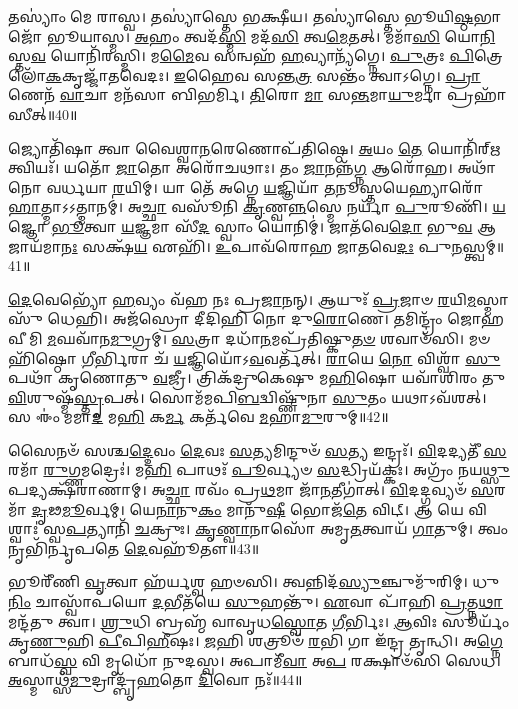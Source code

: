 𑌤𑌸𑍍𑌯𑌾𑌂॑ 𑌮𑍇 𑌰𑌾𑌸𑍍𑌵।
𑌤𑌸𑍍𑌯𑌾॑𑌸𑍍𑌤𑍇 𑌭𑌕𑍍𑌷𑍀𑌯।
𑌤𑌸𑍍𑌯𑌾॑𑌸𑍍𑌤𑍇 𑌭𑍂𑌯𑌿\-\ul{𑌷𑍍𑌠}\-𑌭𑌾𑌜𑍋᳴ 𑌭𑍂𑌯𑌾𑌸𑍍𑌮।
\-\ul{𑌅}\-𑌹𑌂 𑌤𑍍𑌵𑌦᳴\-\ul{𑌸𑍍𑌮𑌿} 𑌮𑌦᳴\-\ul{𑌸𑌿} 𑌤𑍍𑌵\-\ul{𑌮𑍇}\-𑌤𑌤𑍍।
𑌮𑌮𑌾᳴\-\ul{𑌸𑌿} 𑌯𑍋\-\ul{𑌨𑌿}\-𑌸𑍍𑌤\-\ul{𑌵} 𑌯𑍋𑌨𑌿᳴𑌰𑌸𑍍𑌮𑌿।
𑌮\-\ul{𑌮𑍈}\-𑌵 𑌸𑌨𑍍𑌵𑌹᳴ \ul{𑌹}\-𑌵𑍍𑌯𑌾𑌨𑍍𑌯᳴𑌗𑍍𑌨𑍇।
\-\ul{𑌪𑍁}\-𑌤𑍍𑌰𑌃 \ul{𑌪𑌿}\-𑌤𑍍𑌰𑍇 𑌲𑍋᳴\-\ul{𑌕}\-𑌕𑍃𑌜𑍍𑌜𑌾᳴𑌤𑌵𑍇𑌦𑌃।
\-\ul{𑌇}\-𑌹𑍈𑌵 𑌸𑌨𑍍𑌤\-\ul{𑌤𑍍𑌰} 𑌸𑌨𑍍𑌤𑌂᳴ 𑌤𑍍𑌵𑌾\-𑌽𑌗𑍍𑌨𑍇।
\-\ul{𑌪𑍍𑌰𑌾}\-𑌣𑍇𑌨᳴ \ul{𑌵𑌾}\-𑌚𑌾 𑌮𑌨᳴𑌸𑌾 𑌬𑌿𑌭𑌰𑍍𑌮𑌿।
\-\ul{𑌤𑌿}\-𑌰𑍋 \ul{𑌮𑌾} 𑌸\-\ul{𑌨𑍍𑌤}\-𑌮𑌾\-\ul{𑌯𑍁}\-𑌰𑍍𑌮𑌾 𑌪𑍍𑌰𑌹𑌾᳴𑌸𑍀𑌤𑍍॥40॥

𑌜𑍍𑌯𑍋𑌤𑌿᳴𑌷𑌾 𑌤𑍍𑌵𑌾 𑌵𑍈𑌶𑍍𑌵𑌾\-\ul{𑌨}\-𑌰𑍇𑌣𑍋𑌪᳴𑌤𑌿𑌷𑍍𑌠𑍇।
\-\ul{𑌅}\-𑌯𑌂 \ul{𑌤𑍇} 𑌯𑍋𑌨𑌿᳴𑌰𑍍\mbox{}\-\ul{𑌋}\-𑌤𑍍𑌵𑌿𑌯𑌃᳴।
𑌯𑌤𑍋᳴ \ul{𑌜𑌾}\-𑌤𑍋 𑌅𑌰𑍋᳴𑌚𑌥𑌾𑌃।
𑌤𑌂 \ul{𑌜𑌾}\-𑌨𑌨𑍍𑌨᳴\-\ul{𑌗𑍍𑌨} 𑌆𑌰𑍋᳴𑌹।
𑌅𑌥𑌾᳴ 𑌨𑍋 𑌵𑌰𑍍𑌧𑌯𑌾 \ul{𑌰}\-𑌯𑌿𑌮𑍍।
𑌯𑌾 𑌤𑍇᳴ 𑌅𑌗𑍍𑌨𑍇 \ul{𑌯}\-𑌜𑍍𑌞𑌿𑌯𑌾᳴ \ul{𑌤}\-𑌨𑍂𑌸𑍍𑌤𑌯𑍇𑌹𑍍𑌯𑌾𑌰𑍋᳴\-\ul{𑌹𑌾}\-𑌤𑍍𑌮𑌾\-𑌽𑌽𑌤𑍍𑌮𑌾𑌨𑌮𑍍॑।
𑌅\-\ul{𑌚𑍍𑌛𑌾} 𑌵𑌸𑍂᳴𑌨𑌿 \ul{𑌕𑍃}\-𑌣𑍍𑌵\-\ul{𑌨𑍍𑌨}\-𑌸𑍍𑌮𑍇 𑌨𑌰𑍍𑌯𑌾᳴ \ul{𑌪𑍁}\-𑌰𑍂𑌣𑌿᳴।
\-\ul{𑌯}\-𑌜𑍍𑌞𑍋 \ul{𑌭𑍂}\-𑌤𑍍𑌵𑌾 \ul{𑌯}\-𑌜𑍍𑌞𑌮𑌾 𑌸𑍀᳴\-\ul{𑌦} 𑌸𑍍𑌵𑌾𑌂 𑌯𑍋𑌨𑌿𑌮𑍍॑।
𑌜𑌾𑌤᳴𑌵𑍇\-\ul{𑌦𑍋} 𑌭𑍁\-\ul{𑌵} 𑌆 𑌜𑌾𑌯᳴𑌮𑌾\-\ul{𑌨𑌃} 𑌸𑌕𑍍𑌷᳴\-\ul{𑌯} 𑌏𑌹𑌿᳴।
\-\ul{𑌉}\-𑌪𑌾𑌵᳴𑌰𑍋𑌹 𑌜𑌾𑌤𑌵𑍇\-\ul{𑌦𑌃} 𑌪𑍁\-\ul{𑌨}\-𑌸𑍍𑌤𑍍𑌵𑌮𑍍॥41॥

\-\ul{𑌦𑍇}\-𑌵𑍇𑌭𑍍𑌯𑍋᳴ \ul{𑌹}\-𑌵𑍍𑌯𑌂 𑌵᳴𑌹 𑌨𑌃 𑌪𑍍𑌰\-\ul{𑌜𑌾}\-𑌨𑌨𑍍।
𑌆𑌯𑍁𑌃᳴ \ul{𑌪𑍍𑌰}\-𑌜𑌾𑍞 \ul{𑌰}\-𑌯𑌿\-\ul{𑌮}\-𑌸𑍍𑌮𑌾𑌸𑍁᳴ 𑌧𑍇𑌹𑌿।
𑌅𑌜᳴𑌸𑍍𑌰𑍋 𑌦𑍀𑌦𑌿𑌹𑌿 𑌨𑍋 𑌦𑍁\-\ul{𑌰𑍋}\-𑌣𑍇।
𑌤𑌮𑌿𑌨𑍍𑌦𑍍𑌰𑌂᳴ 𑌜𑍋𑌹𑌵𑍀𑌮𑌿 \ul{𑌮}\-𑌘𑌵𑌾᳴𑌨\-\ul{𑌮𑍁}\-𑌗𑍍𑌰𑌮𑍍।
\-\ul{𑌸}\-𑌤𑍍𑌰𑌾 𑌦𑌧𑌾᳴\-\ul{𑌨}\-𑌮𑌪𑍍𑌰᳴𑌤𑌿𑌷𑍍𑌕𑍁\-\ul{𑌤}\-\-\ul{𑍞} 𑌶𑌵𑌾𑍞᳴𑌸𑌿।
𑌮𑍞𑌹𑌿᳴𑌷𑍍𑌠𑍋 \ul{𑌗𑍀}\-𑌰𑍍𑌭𑌿𑌰𑌾 𑌚᳴ \ul{𑌯}\-𑌜𑍍𑌞𑌿𑌯𑍋᳴\-𑌽\-\ul{𑌵}\-𑌵𑌰𑍍𑌤᳴𑌤𑍍।
\-\ul{𑌰𑌾}\-𑌯𑍇 \ul{𑌨𑍋} 𑌵𑌿𑌶𑍍𑌵𑌾᳴ \ul{𑌸𑍁}\-𑌪𑌥𑌾᳴ 𑌕𑍃𑌣𑍋𑌤𑍁 \ul{𑌵}\-𑌜𑍍𑌰𑍀।
𑌤𑍍𑌰𑌿𑌕᳴𑌦𑍍𑌰𑍁𑌕𑍇𑌷𑍁 𑌮\-\ul{𑌹𑌿}\-𑌷𑍋 𑌯𑌵𑌾᳴𑌶𑌿𑌰𑌂 𑌤𑍁\-\ul{𑌵𑌿}\-𑌶𑍁𑌷𑍍𑌮᳴\-\ul{𑌸𑍍𑌤𑍃}\-𑌪𑌤𑍍।
𑌸𑍋𑌮᳴𑌮𑌪𑌿\-\ul{𑌬}\-𑌦𑍍𑌵𑌿𑌷𑍍𑌣𑍁᳴𑌨𑌾 \ul{𑌸𑍁}\-𑌤𑌂 𑌯𑌥𑌾\-𑌽𑌵᳴𑌶𑌤𑍍।
𑌸 𑌈𑌂॑ 𑌮𑌮𑌾\-\ul{𑌦} 𑌮\-\ul{𑌹𑌿} 𑌕\-\ul{𑌰𑍍𑌮} 𑌕𑌰𑍍𑌤᳴𑌵𑍇 \ul{𑌮}\-𑌹𑌾\-\ul{𑌮𑍁}\-𑌰𑍁𑌮𑍍॥42॥

𑌸𑍈𑌨𑍞᳴ 𑌸𑌶𑍍𑌚\-\ul{𑌦𑍍𑌦𑍇}\-𑌵𑌂 \ul{𑌦𑍇}\-𑌵𑌃 \ul{𑌸}\-𑌤𑍍𑌯𑌮𑌿𑌨𑍍𑌦𑍁𑍞᳴ \ul{𑌸}\-𑌤𑍍𑌯 𑌇𑌨𑍍𑌦𑍍𑌰𑌃᳴।
\-\ul{𑌵𑌿}\-𑌦𑌦𑍍𑌯𑌤𑍀᳴ \ul{𑌸}\-𑌰𑌮𑌾᳴ \ul{𑌰𑍁}\-𑌗𑍍𑌣𑌮𑌦𑍍𑌰𑍇𑌃॑।
𑌮\-\ul{𑌹𑌿} 𑌪𑌾𑌥𑌃᳴ \ul{𑌪𑍂}\-𑌰𑍍𑌵𑍍𑌯𑍞 \ul{𑌸}\-𑌦𑍍𑌧𑍍𑌰𑌿𑌯᳴𑌕𑍍𑌕𑌃।
𑌅𑌗𑍍𑌰𑌂᳴ 𑌨𑌯\-\ul{𑌥𑍍𑌸𑍁}\-𑌪𑌦𑍍𑌯𑌕𑍍𑌷᳴𑌰𑌾𑌣𑌾𑌮𑍍।
𑌅\-\ul{𑌚𑍍𑌛𑌾} 𑌰𑌵𑌂᳴ 𑌪𑍍𑌰\-\ul{𑌥}\-𑌮𑌾 𑌜𑌾᳴\-\ul{𑌨}\-𑌤𑍀𑌗𑌾॑𑌤𑍍।
\-\ul{𑌵𑌿}\-𑌦𑌦𑍍𑌗𑌵𑍍𑌯𑍞᳴ \ul{𑌸}\-𑌰𑌮𑌾᳴ \ul{𑌦𑍃}\-𑌢\-\ul{𑌮𑍂}\-𑌰𑍍𑌵𑌮𑍍।
𑌯𑍇\-\ul{𑌨𑌾}\-𑌨𑍁\-\ul{𑌕𑌂} 𑌮𑌾𑌨𑍁᳴\-\ul{𑌷𑍀} 𑌭𑍋𑌜᳴\-\ul{𑌤𑍇} 𑌵𑌿𑌟𑍍।
𑌆 𑌯𑍇 𑌵𑌿𑌶𑍍𑌵𑌾𑌃॑ 𑌸𑍍𑌵\-\ul{𑌪}\-𑌤𑍍𑌯𑌾𑌨𑌿᳴ \ul{𑌚}\-𑌕𑍍𑌰𑍁𑌃।
\-\ul{𑌕𑍃}\-\-\ul{𑌣𑍍𑌵𑌾}\-𑌨𑌾𑌸𑍋᳴ 𑌅𑌮𑍃\-\ul{𑌤}\-𑌤𑍍𑌵𑌾𑌯᳴ \ul{𑌗𑌾}\-𑌤𑍁𑌮𑍍।
𑌤𑍍𑌵𑌂 𑌨𑍃𑌭𑌿᳴𑌰𑍍𑌨𑍃𑌪𑌤𑍇 \ul{𑌦𑍇}\-𑌵𑌹𑍂᳴𑌤𑍗॥43॥

𑌭𑍂𑌰𑍀᳴𑌣𑌿 \ul{𑌵𑍃}\-𑌤𑍍𑌵𑌾 𑌹᳴𑌰𑍍𑌯𑌶𑍍𑌵 𑌹𑍞𑌸𑌿।
𑌤𑍍𑌵𑌨𑍍𑌨𑌿𑌦᳴\-\ul{𑌸𑍍𑌯𑍁}\-𑌞𑍍𑌚𑍁𑌮𑍁᳴𑌰𑌿𑌮𑍍।
𑌧𑍁\-\ul{𑌨𑌿𑌂} 𑌚𑌾𑌸𑍍𑌵𑌾᳴𑌪𑌯𑍋 \ul{𑌦}\-𑌭𑍀𑌤᳴𑌯𑍇 \ul{𑌸𑍁}\-𑌹𑌨𑍍𑌤𑍁᳴।
\-\ul{𑌏}\-𑌵𑌾 𑌪𑌾᳴𑌹𑌿 \ul{𑌪𑍍𑌰}\-𑌤𑍍𑌨\-\ul{𑌥𑌾} 𑌮𑌨𑍍𑌦᳴𑌤𑍁 𑌤𑍍𑌵𑌾।
\-\ul{𑌶𑍍𑌰𑍁}\-𑌧𑌿 𑌬𑍍𑌰𑌹𑍍𑌮᳴ 𑌵𑌾𑌵𑍃𑌧\-\ul{𑌸𑍍𑌵𑍋}\-𑌤 \ul{𑌗𑍀}\-𑌰𑍍𑌭𑌿𑌃।
\-\ul{𑌆}\-𑌵𑌿𑌃 𑌸𑍂𑌰𑍍𑌯𑌂᳴ 𑌕𑍃\-\ul{𑌣𑍁}\-𑌹𑌿 \ul{𑌪𑍀}\-𑌪𑌿\-\ul{𑌹𑍀}\-𑌷𑌃।
\-\ul{𑌜}\-𑌹𑌿 𑌶𑌤𑍍𑌰𑍂𑍞᳴ \ul{𑌰}\-𑌭𑌿 𑌗𑌾 𑌇᳴𑌨𑍍𑌦𑍍𑌰 𑌤𑍃𑌨𑍍𑌧𑌿।
𑌅\-\ul{𑌗𑍍𑌨𑍇} 𑌬𑌾𑌧᳴\-\ul{𑌸𑍍𑌵} 𑌵𑌿 𑌮𑍃𑌧𑍋᳴ 𑌨𑍁𑌦𑌸𑍍𑌵।
𑌅𑌪𑌾𑌮𑍀᳴\-\ul{𑌵𑌾} 𑌅\-\ul{𑌪} 𑌰𑌕𑍍𑌷𑌾𑍞᳴𑌸𑌿 𑌸𑍇𑌧।
\-\ul{𑌅}\-𑌸𑍍𑌮𑌾𑌥𑍍𑌸᳴\-\ul{𑌮𑍁}\-𑌦𑍍𑌰𑌾𑌦𑍍𑌬𑍃᳴\-\ul{𑌹}\-𑌤𑍋 \ul{𑌦𑌿}\-𑌵𑍋 𑌨𑌃᳴॥44॥

